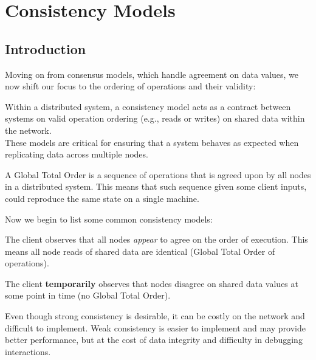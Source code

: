 \newpage 
\section{Consistency Models}
\subsection{Introduction}

Moving on from consensus models, which handle agreement on data values,
we now shift our focus to the ordering of operations and their validity:

\begin{Def}

    Within a distributed system, a consistency model acts as a contract 
    between systems on valid operation ordering (e.g., reads or writes) on shared data within the network.\\

    \noindent
    These models are critical for ensuring that a system behaves as expected when 
    replicating data across multiple nodes. \hfill \cite{scylladbConsistencyModels}
\end{Def}

\begin{Def}
    
    A Global Total Order is a sequence of operations that is agreed upon by all nodes in a distributed system.
    This means that such sequence given some client inputs, could reproduce the same state on a single machine.
\end{Def}

\noindent
Now we begin to list some common consistency models:

\begin{Def}
    
    The client observes that all nodes \textit{appear} to agree on the order of execution. This means 
    all node reads of shared data are identical
    (Global Total Order of operations).
\end{Def}
\begin{Def}
    
    The client \textbf{temporarily} observes that nodes disagree on shared data values at some point in time (no Global Total Order).
\end{Def}

\begin{theo}
    
    Even though strong consistency is desirable, it can be costly on the network and difficult to implement.
    Weak consistency is easier to implement and may provide better performance, but at the cost of data integrity and difficulty in debugging interactions.
\end{theo}
\newpage 

